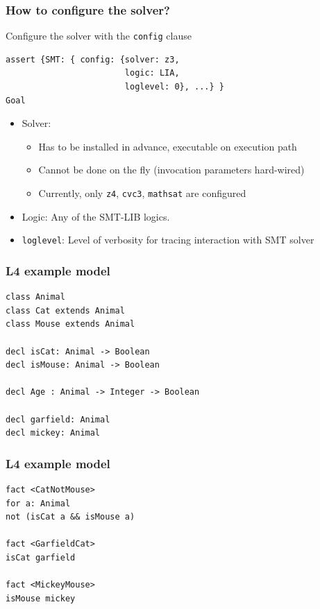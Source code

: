 \documentclass{beamer}
\begin{document}
\begin{frame}[fragile]\frametitle{How to configure the solver?}

Configure the solver with the \texttt{config} clause
\begin{verbatim}
assert {SMT: { config: {solver: z3, 
                        logic: LIA, 
                        loglevel: 0}, ...} }
Goal
\end{verbatim}

\begin{itemize}
\item Solver:
  \begin{itemize}
  \item Has to be installed in advance, executable on execution path
  \item Cannot be done on the fly (invocation parameters hard-wired)
  \item Currently, only \texttt{z4}, \texttt{cvc3}, \texttt{mathsat} are configured
  \end{itemize}
\item Logic: Any of the SMT-LIB logics. 
\item \texttt{loglevel}: Level of verbosity for tracing interaction with SMT solver
\end{itemize}

\end{frame}


\begin{frame}[fragile]\frametitle{L4 example model}


  \begin{verbatim}
class Animal
class Cat extends Animal
class Mouse extends Animal

decl isCat: Animal -> Boolean
decl isMouse: Animal -> Boolean

decl Age : Animal -> Integer -> Boolean

decl garfield: Animal
decl mickey: Animal
\end{verbatim}
  
\end{frame}


\begin{frame}[fragile]\frametitle{L4 example model}


\begin{verbatim}
fact <CatNotMouse>
for a: Animal
not (isCat a && isMouse a)

fact <GarfieldCat>
isCat garfield

fact <MickeyMouse>
isMouse mickey
\end{verbatim}
  
\end{frame}
\end{document}
